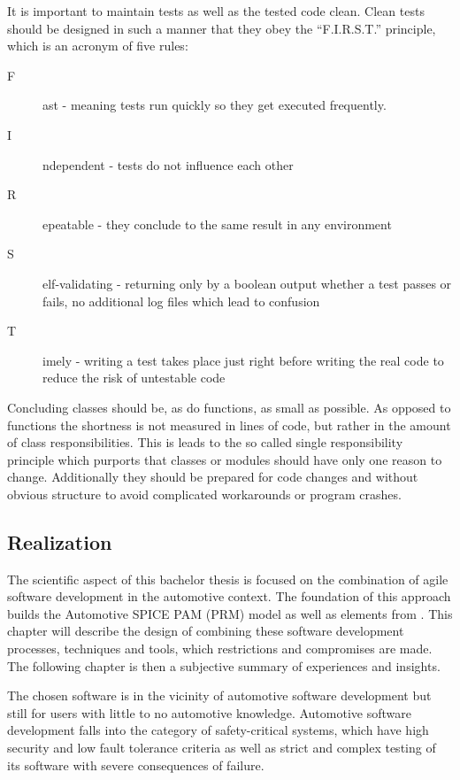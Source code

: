 It is important to maintain tests as well as the tested code clean. Clean tests should be designed in such a manner that they obey the “F.I.R.S.T.” principle, 
which is an acronym of five rules:

\begin{description}
 \item [F]ast - meaning tests run quickly so they get executed frequently.
 \item [I]ndependent - tests do not influence each other
 \item [R]epeatable - they conclude to the same result in any environment
 \item [S]elf-validating - returning only by a boolean output whether a test passes or fails, no additional log files which lead to confusion
 \item [T]imely - writing a test takes place just right before writing the real code to reduce the risk of untestable code
\end{description}

Concluding classes should be, as do functions, as small as possible. As opposed to functions the shortness is not measured in lines of code, but 
rather in the amount of class responsibilities. This is leads to the so called single responsibility principle which purports that classes or modules 
should have only one reason to change. Additionally they should be prepared for code changes and without obvious structure to avoid complicated workarounds
or program crashes.

\subsection{Realization}

The scientific aspect of this bachelor thesis is focused on the combination of agile software development in the automotive context. The 
foundation of this approach builds the Automotive SPICE PAM (PRM) model as well as elements from \citeauthor{BECK} . 
This chapter will describe the design of combining these software development processes, techniques and tools, which restrictions  
and compromises are made. The following chapter  is then a subjective summary of experiences and insights.

The chosen software is in the vicinity of automotive software development but still for users with little to no automotive knowledge. 
Automotive software development falls into the category of safety-critical systems, which have high 
security and low fault tolerance criteria as well as strict and complex testing of its software with severe consequences of failure.

